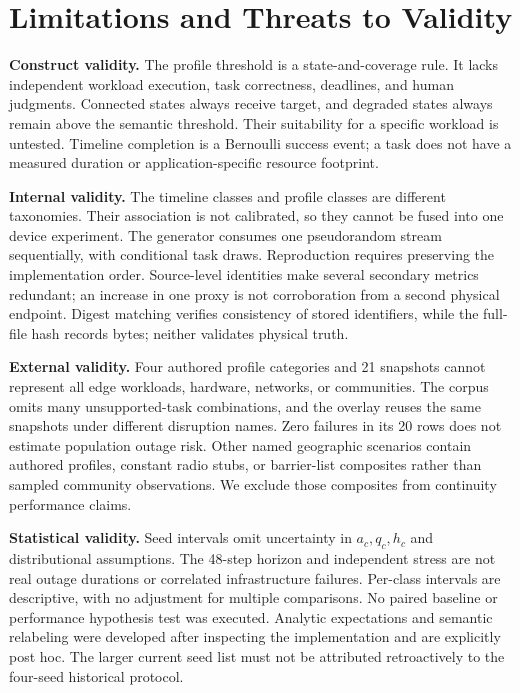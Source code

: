 \section{Limitations and Threats to Validity}
\label{sec:limitations}
\textbf{Construct validity.} The profile threshold is a state-and-coverage rule. It lacks independent workload execution, task correctness, deadlines, and human judgments. Connected states always receive target, and degraded states always remain above the semantic threshold. Their suitability for a specific workload is untested. Timeline completion is a Bernoulli success event; a task does not have a measured duration or application-specific resource footprint.

\textbf{Internal validity.} The timeline classes and profile classes are different taxonomies. Their association is not calibrated, so they cannot be fused into one device experiment. The generator consumes one pseudorandom stream sequentially, with conditional task draws. Reproduction requires preserving the implementation order. Source-level identities make several secondary metrics redundant; an increase in one proxy is not corroboration from a second physical endpoint. Digest matching verifies consistency of stored identifiers, while the full-file hash records bytes; neither validates physical truth.

\textbf{External validity.} Four authored profile categories and 21 snapshots cannot represent all edge workloads, hardware, networks, or communities. The corpus omits many unsupported-task combinations, and the overlay reuses the same snapshots under different disruption names. Zero failures in its 20 rows does not estimate population outage risk. Other named geographic scenarios contain authored profiles, constant radio stubs, or barrier-list composites rather than sampled community observations. We exclude those composites from continuity performance claims.

\textbf{Statistical validity.} Seed intervals omit uncertainty in $a_c,q_c,h_c$ and distributional assumptions. The 48-step horizon and independent stress are not real outage durations or correlated infrastructure failures. Per-class intervals are descriptive, with no adjustment for multiple comparisons. No paired baseline or performance hypothesis test was executed. Analytic expectations and semantic relabeling were developed after inspecting the implementation and are explicitly post hoc. The larger current seed list must not be attributed retroactively to the four-seed historical protocol.

